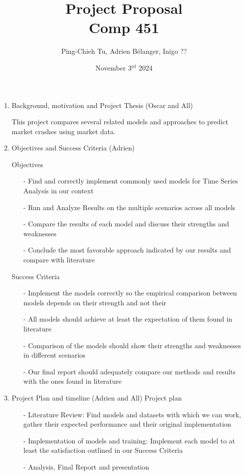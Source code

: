 \documentclass[12pt, letterpaper]{article}
\title{
  Project Proposal \\
  \Large Comp 451}
\author{Ping-Chieh Tu, Adrien Bélanger, Inigo ??}
\date{November 3$^{\text{rd}}$ 2024}
\begin{document}
\maketitle 

\begin{enumerate}
    \item Background, motivation and Project Thesis (Oscar and All)
    
    This project compares several related models and approaches to predict market crashes using market data.
    
    \item Objectives and Success Criteria (Adrien)
    
        Objectives
        \begin{itemize}
            \item[-] Find and correctly implement commonly used models for Time Series Analysis in our context
            \item[-] Run and Analyze Results on the multiple scenarios across all models
            \item[-] Compare the results of each model and discuss their strengths and weaknesses
            \item[-] Conclude the most favorable approach indicated by our results and compare with literature
        \end{itemize} 
        Success Criteria
        \begin{itemize}
            \item [-] Implement the models correctly so the empirical comparison between models depends on their strength and not their
            \item [-] All models should achieve at least the expectation of them found in literature
            \item [-] Comparison of the models should show their strengths and weaknesses in different scenarios
            \item [-] Our final report should adequately compare our methods and results with the ones found in literature
        \end{itemize}
        
    \item Project Plan and timeline (Adrien and All)
        Project plan
        \begin{itemize}
            \item [-] Literature Review: Find models and datasets with which we can work, gather their expected performance and their original implementation
            \item [-] Implementation of models and training: Implement each model to at least the satisfaction outlined in our Success Criteria
            \item [-] Analysis, Final Report and presentation
        \end{itemize}
    

\end{enumerate}
\end{document}
